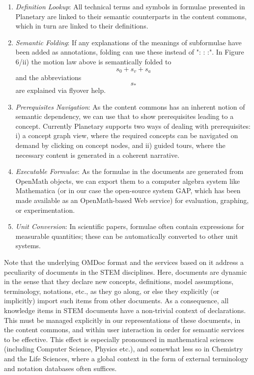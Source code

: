 \begin{enumerate}
\item \textit{Definition Lookup}: All technical terms and symbols in formulae presented in
  Planetary are linked to their semantic counterparts in the content commons, which in
  turn are linked to their definitions.
\item \textit{Semantic Folding}: If any explanations of the meanings of subformulae have
  been added as annotations, folding can use these instead of ": : :". In Figure 6/ii) the
  motion law above is semantically folded to \[s_0 + s_v + s_a \]
  and the abbreviations \[s_*\] are explained via flyover help.
\item \textit{Prerequisites Navigation}: As the content commons has an inherent notion of
  semantic dependency, we can use that to show prerequisites leading to a
  concept. Currently Planetary supports two ways of dealing with prerequisites: i) a
  concept graph view, where the required concepts can be navigated on demand by clicking
  on concept nodes, and ii) guided tours, where the necessary content is generated in a
  coherent narrative.
\item \textit{Executable Formulae}: As the formulae in the documents are generated from
  OpenMath objects, we can export them to a computer algebra system like Mathematica (or
  in our case the open-source system GAP, which has been made available as an
  OpenMath-based Web service) for evaluation, graphing, or experimentation.
\item \textit{Unit Conversion}: In scientific papers, formulae often contain expressions
  for measurable quantities; these can be automatically converted to other unit systems.
\end{enumerate}

Note that the underlying OMDoc format and the services based on it address a peculiarity
of documents in the STEM disciplines. Here, documents are dynamic in the sense that they
declare new concepts, definitions, model assumptions, terminology, notations, etc., as
they go along, or else they explicitly (or implicitly) import such items from other
documents. As a consequence, all knowledge items in STEM documents have a non-trivial
context of declarations. This must be managed explicitly in our representations of these
documents, in the content commons, and within user interaction in order for semantic
services to be effective. This effect is especially pronounced in mathematical sciences
(including Computer Science, Physics etc.), and somewhat less so in Chemistry and the Life
Sciences, where a global context in the form of external terminology and notation
databases often suffices.

